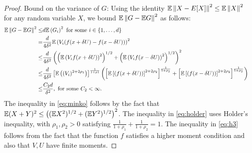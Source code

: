 \begin{proof}
Bound on the variance of $G$:
Using the identity $\mathbb{E}\left\|X -  E[X]\right\|^2 \le \mathbb{E} \left\|X\right\|^2$ for any random variable $X$, we bound $\mathbb{E}\left\| G - \mathbb{E} G\right\|^2$ as follows:
\begin{align}
\mathbb{E}\left\| G - \mathbb{E} G\right\|^2 \le& d \mathbb{E} \left(G_i\right)^2 \label{eq:mi} \text{ for some } i\in \{1,\ldots,d\}\\
= & \dfrac{d}{4\delta^2} \mathbb{E}\left(V_i(f(x+\delta U) -f(x-\delta U))\right)^2 \nonumber\\
\le & \dfrac{d}{4\delta^2} \left(\left(\mathbb{E}\left(V_i f(x+\delta U) \right)^2\right)^{1/2}
+ \left(\mathbb{E}\left(V_i f(x-\delta U)\right)^2\right)^{1/2}\right)^2 \label{eq:minko}\\
\le &\frac{d}{4\delta^2} \left[ \mathbb{E}\left((V_i)^{2+2\rho_1}\right) \right]^{\frac{1}{1+\rho1}} 
\left(\left[\mathbb{E}\left[ (f(x+\delta U))\right]^{2+2\rho_2}\right]^{\frac{1}{1+\rho_2}} +
\left[\mathbb{E}\left[ (f(x-\delta U))\right]^{2+2\rho_2}\right]^{\frac{1}{1+\rho_2}}\right)\label{eq:holder}\\
\le & \frac{C_2 d}{\delta^2}, \text{ for some } C_2< \infty. \label{eq:h3}
\end{align}
The inequality in \eqref{eq:minko} follows by the fact that $\mathbb{E} (X+Y)^2 \le \left( (\mathbb{E} X^2)^{1/2} + (\mathbb{E} Y^2)^{1/2}\right)^2$.
The inequality in \eqref{eq:holder} uses Holder's inequality, with $\rho_1, \rho_2>0$ satisfying $\frac{1}{1+\rho_1} + \frac{1}{1+\rho_2}=1$. 
The inequality in \eqref{eq:h3} follows from the fact that the function $f$ satisfies a higher moment condition and also that $V,U$ have finite moments. 
\end{proof}


